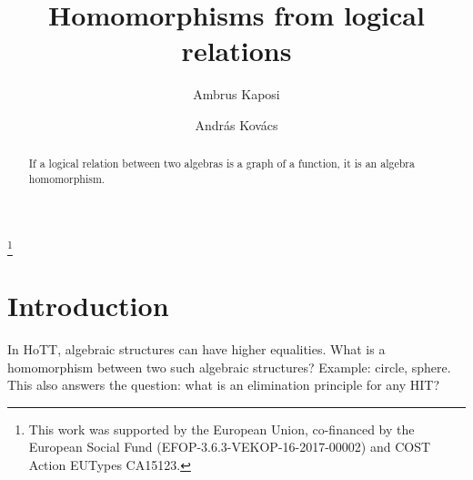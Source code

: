 \documentclass{lmcs} %
\theoremstyle{plain}\newtheorem{satz}[thm]{Satz} %
\begin{document}
\title[Short title TODO]{Homomorphisms from logical relations}

\author[A.~Kaposi]{Ambrus Kaposi}	%
\address{Department of Programming Languages and Compilers, E{\"o}tv{\"o}s Lor{\'a}nd University, Budapest, Hungary}	%

\author[A.~Kov{\'a}cs]{Andr{\'a}s Kov{\'a}cs}	%
\address{Department of Programming Languages and Compilers, E{\"o}tv{\"o}s Lor{\'a}nd University, Budapest, Hungary}	%
\thanks{This work was supported by the European Union, co-financed by the
European Social Fund (EFOP-3.6.3-VEKOP-16-2017-00002) and COST Action
EUTypes CA15123.}	%





\begin{abstract}
  \noindent If a logical relation between two algebras is a graph of a
  function, it is an algebra homomorphism. 
\end{abstract}

\maketitle

\section*{Introduction}

In HoTT, algebraic structures can have higher equalities. What is a
homomorphism between two such algebraic structures? Example: circle,
sphere. This also answers the question: what is an elimination
principle for any HIT?
\end{document}

